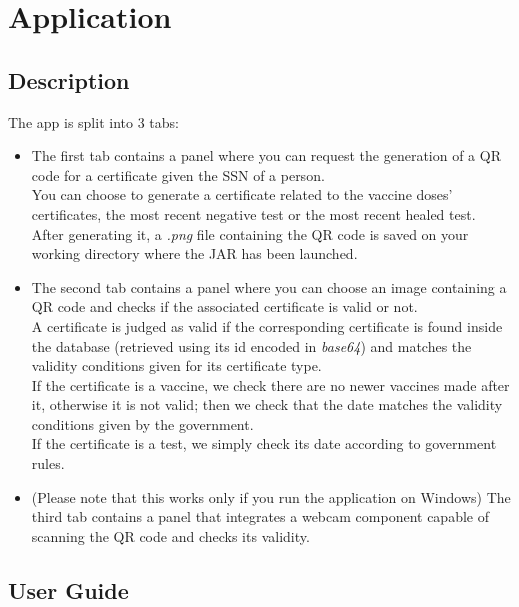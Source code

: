 \documentclass[12pt, a4paper]{article}
\begin{document}
\clearpage

\section{Application}
\label{sec:Application}

\subsection{Description}

The app is split into 3 tabs: 
\begin{itemize}
    \item The first tab contains a panel where you can request the generation of a
        QR code for a certificate given the SSN of a person. \\ 
        You can choose to generate a certificate related to the vaccine doses' 
        certificates, the most recent negative test or the most recent healed test. \\ 
        After generating it, a \emph{.png} file containing the QR code is saved on your 
        working directory where the JAR has been launched. 
    \item The second tab contains a panel where you can choose an image containing a QR 
        code and checks if the associated certificate is valid or not. \\
        A certificate is judged as valid if the corresponding certificate is found inside
        the database (retrieved using its id encoded in \emph{base64}) and matches the 
        validity conditions given for its certificate type. \\
        If the certificate is a vaccine, we check there are no newer vaccines made after 
        it, otherwise it is not valid; then we check that the date matches the validity 
        conditions given by the government. \\
        If the certificate is a test, we simply check its date according to government 
        rules.
    \item (Please note that this works only if you run the application on Windows) The 
        third tab contains a panel that integrates a webcam component capable of 
        scanning the QR code and checks its validity.
\end{itemize}

\subsection{User Guide}
\end{document}
